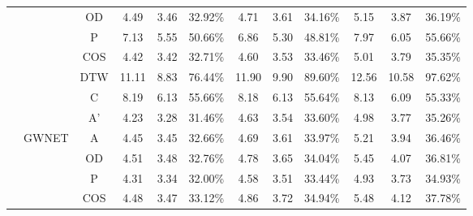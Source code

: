 \begin{table}[t!]
\begin{center}
{\begin{tabular}{c|c|c|ccc|ccc|ccc}
                                                 &                        & OD                      & 4.49       & 3.46      & 32.92\%     & 4.71      & 3.61      & 34.16\%     & 5.15       & 3.87       & 36.19\%     \\
                                                 &                        & P                       & 7.13       & 5.55      & 50.66\%     & 6.86      & 5.30      & 48.81\%     & 7.97       & 6.05       & 55.66\%     \\
                                                 &                        & COS                     & 4.42       & 3.42      & 32.71\%     & 4.60      & 3.53      & 33.46\%     & 5.01       & 3.79       & 35.35\%     \\
                                                 &                        & DTW                     & 11.11      & 8.83      & 76.44\%     & 11.90     & 9.90      & 89.60\%     & 12.56      & 10.58      & 97.62\%     \\
                                                 &                        & C                       & 8.19       & 6.13      & 55.66\%     & 8.18      & 6.13      & 55.64\%     & 8.13       & 6.09       & 55.33\%     \\
                                                 &                        & A'                      & 4.23       & 3.28      & 31.46\%     & 4.63      & 3.54      & 33.60\%     & 4.98       & 3.77       & 35.26\%     \\
                \cline{2-12}
                                                 & \multirow{7}{*}{GWNET} & A                       & 4.45       & 3.45      & 32.66\%     & 4.69      & 3.61      & 33.97\%     & 5.21       & 3.94       & 36.46\%     \\
                                                 &                        & OD                      & 4.51       & 3.48      & 32.76\%     & 4.78      & 3.65      & 34.04\%     & 5.45       & 4.07       & 36.81\%     \\
                                                 &                        & P                       & 4.31       & 3.34      & 32.00\%     & 4.58      & 3.51      & 33.44\%     & 4.93       & 3.73       & 34.93\%     \\
                                                 &                        & COS                     & 4.48       & 3.47      & 33.12\%     & 4.86      & 3.72      & 34.94\%     & 5.48       & 4.12       & 37.78\%     \\

\end{tabular}}
\end{center}
\end{table}
